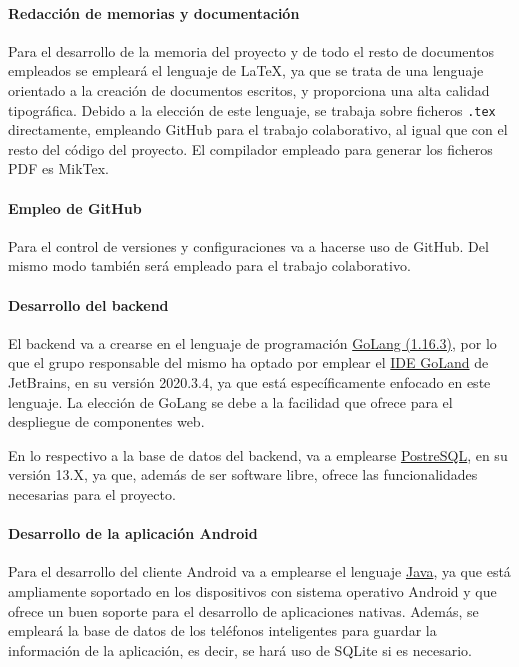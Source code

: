 \documentclass{article}
\begin{document}
\paragraph*{Redacción de memorias y documentación}
Para el desarrollo de la memoria del proyecto y de todo el resto de documentos empleados se empleará el lenguaje de \LaTeX, ya que se trata de una lenguaje orientado a la creación de documentos escritos, y proporciona una alta calidad tipográfica.
Debido a la elección de este lenguaje, se trabaja sobre ficheros \texttt{.tex} directamente, empleando GitHub para el trabajo colaborativo, al igual que con el resto del código del proyecto. El compilador empleado para generar los ficheros PDF es MikTex.

\paragraph*{Empleo de GitHub}
Para el control de versiones y configuraciones va a hacerse uso de GitHub. Del mismo modo también será empleado para el trabajo colaborativo.


\paragraph*{Desarrollo del backend}
El backend va a crearse en el lenguaje de programación \href{https://golang.org/dl/}{GoLang (1.16.3)}, por lo que el grupo responsable del mismo ha optado por emplear el \href{https://www.jetbrains.com/es-es/go/}{IDE GoLand} de JetBrains, en su versión 2020.3.4, ya que está específicamente enfocado en este lenguaje. La elección de GoLang se debe a la facilidad que ofrece para el despliegue de componentes web.

En lo respectivo a la base de datos del backend, va a emplearse \href{https://www.postgresql.org/download/}{PostreSQL}, en su versión 13.X, ya que, además de ser software libre, ofrece las funcionalidades necesarias para el proyecto.



\paragraph*{Desarrollo de la aplicación Android}
Para el desarrollo del cliente Android va a emplearse el lenguaje \href{https://www.java.com/es/}{Java}, ya que está ampliamente soportado en los dispositivos con sistema operativo Android y que ofrece un buen soporte para el desarrollo de aplicaciones nativas. Además, se empleará la base de datos de los teléfonos inteligentes para guardar la información de la aplicación, es decir, se hará uso de SQLite si es necesario.
\end{document}
